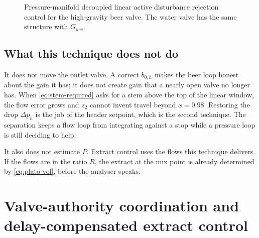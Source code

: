 \begin{figure}[htbp]
\centering
{}
\caption{Pressure-manifold decoupled linear active disturbance rejection control for the high-gravity beer valve. The water valve has the same structure with $G_{ww}$.}
\label{fig:tech1}
\end{figure}

\subsection{What this technique does not do}

It does not move the outlet valve. A correct $b_{0,h}$ makes the beer loop honest about the gain it has; it does not create gain that a nearly open valve no longer has. When \eqref{eq:stem-required} asks for a stem above the top of the linear window, the flow error grows and $z_2$ cannot invent travel beyond $x=0.98$. Restoring the drop $\Delta p_h$ is the job of the header setpoint, which is the second technique. The separation keeps a flow loop from integrating against a stop while a pressure loop is still deciding to help.

It also does not estimate $P$. Extract control uses the flows this technique delivers. If the flows are in the ratio $R$, the extract at the mix point is already determined by \eqref{eq:plato-vol}, before the analyser speaks.

\section{Valve-authority coordination and delay-compensated extract control}
\label{sec:tech2}

